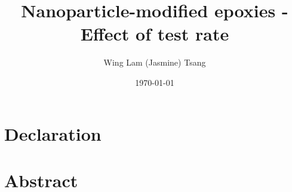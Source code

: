 \documentclass[numbers=noendperiod,chapterprefix=on]{icldt} %
\newcommand{\HRule}{\rule{\linewidth}{0.5mm}}
\begin{document}
\title{Nanoparticle-modified epoxies - Effect of test rate}

\author{Wing Lam (Jasmine) Tsang}
\date{\today}

\maketitle
\newpage


\chapter{Declaration}


\chapter*{Abstract}
\end{document}
